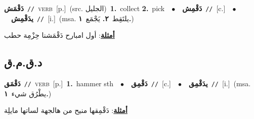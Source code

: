 \documentclass[10pt,a4paper,twoside]{article} %
\begin{document}
\begin{multicols}{2}
{\setlength\topsep{0pt}\textbf{\foreignlanguage{arabic}{دَقْمَش}}\ {\color{gray}\texttt{//}\color{black}}\ \textsc{verb}\ [p.]\ (src. \color{gray}\foreignlanguage{arabic}{الجليل}\color{black})\ \textbf{1.}~collect  \textbf{2.}~pick\ \ $\bullet$\ \ \setlength\topsep{0pt}\textbf{\foreignlanguage{arabic}{دَقْمِش}}\ {\color{gray}\texttt{//}\color{black}}\ [c.]\ \ $\bullet$\ \ \setlength\topsep{0pt}\textbf{\foreignlanguage{arabic}{يدَقْمِش}}\ {\color{gray}\texttt{//}\color{black}}\ [i.]\ \color{gray}(msa. \foreignlanguage{arabic}{يلتَقِط}~\foreignlanguage{arabic}{\textbf{٢.}}  \foreignlanguage{arabic}{يَجْمَع}~\foreignlanguage{arabic}{\textbf{١.}})\color{black}\  \begin{flushright}\color{gray}\foreignlanguage{arabic}{\textbf{\underline{\foreignlanguage{arabic}{أمثلة}}}: أول امبارح دَقْمَشنا حِزْمِة حطب}\end{flushright}\color{black}} \vspace{2mm}

\vspace{-3mm}
\subsection*{\color{blue}\foreignlanguage{arabic}{د.ق.م.ق}\color{blue}{}} 

{\setlength\topsep{0pt}\textbf{\foreignlanguage{arabic}{دَقْمَق}}\ {\color{gray}\texttt{//}\color{black}}\ \textsc{verb}\ [p.]\ \textbf{1.}~hammer sth\ \ $\bullet$\ \ \setlength\topsep{0pt}\textbf{\foreignlanguage{arabic}{دَقْمِق}}\ {\color{gray}\texttt{//}\color{black}}\ [c.]\ \ $\bullet$\ \ \setlength\topsep{0pt}\textbf{\foreignlanguage{arabic}{يدَقْمِق}}\ {\color{gray}\texttt{//}\color{black}}\ [i.]\ \color{gray}(msa. \foreignlanguage{arabic}{يطْرُق شيء}~\foreignlanguage{arabic}{\textbf{١.}})\color{black}\  \begin{flushright}\color{gray}\foreignlanguage{arabic}{\textbf{\underline{\foreignlanguage{arabic}{أمثلة}}}: دَقْمِقها منيح من هالجهة لساتها مايلِة}\end{flushright}\color{black}} \vspace{2mm}


\end{multicols}
\end{document}
